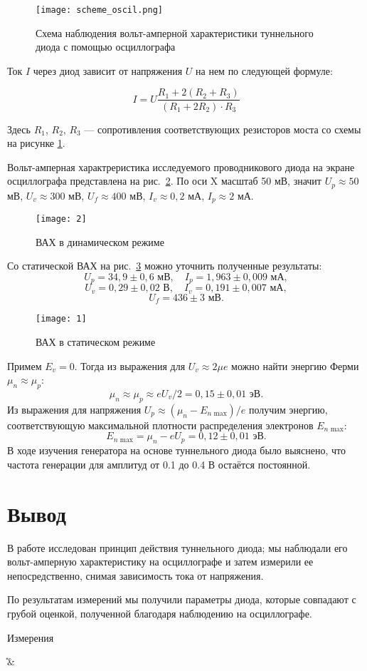 \documentclass[a4paper]{article}
\begin{document}
	\begin{figure}[h]
		\centering	
		\texttt{[image: scheme\_oscil.png]}
		\caption{Схема наблюдения вольт-амперной характеристики туннельного диода с помощью осциллографа}
		\label{pic:scheme_oscil}
	\end{figure}
	
	Ток $I$ через диод зависит от напряжения $U$ на нем по следующей формуле: 
	
	\[ I = U \frac{R_1 + 2(R_2 + R_3)}{(R_1 + 2R_2) \cdot R_3} \]
	
	Здесь $R_1$, $R_2$, $R_3$ --- сопротивления соответствующих резисторов моста со схемы на рисунке \ref{pic:scheme_oscil}. 

Вольт-амперная характреристика исследуемого проводникового диода на экране осциллографа представлена на рис.~\ref{fig:2}. По оси X
масштаб 50 мВ, значит $U_p \approx 50  $ мВ, $U_v \approx 300$ мВ,
$U_f \approx 400$ мВ, $I_v\approx 0,2$ мА, $I_p \approx 2$ мА.
\begin{figure}[htpb]
	\centering
	\texttt{[image: 2]}
	\caption{ВАХ в динамическом режиме}
	\label{fig:2}
\end{figure}
Со статической ВАХ на рис.~\ref{fig:1} можно уточнить полученные
результаты:
\[
U_p= 34,9\pm 0,6 \text{ мВ},\quad I_p=1,963\pm 0,009 \text{ мА}
 ,\]
\[
U_v=0,29 \pm 0,02 \text{ В},\quad I_v=0,191\pm 0,007 \text{ мА}
,\] 
\[
U_f=436\pm 3 \text{ мВ}
.\] 
\begin{figure}[htpb]
	\centering
	\texttt{[image: 1]}
	\caption{ВАХ в статическом режиме}
	\label{fig:1}
\end{figure}
Примем $E_v=0$. Тогда из выражения для $U_v\approx 2\mu e$ 
можно найти энергию Ферми $\mu_n \approx \mu_p$:
\[
\mu_n \approx \mu_p \approx e U_v /2=0,15\pm 0,01 \text{ эВ}
.\] 
Из выражения для напряжения $U_p\approx (\mu_n -E_{n \text{ max}}) /e$ получим энергию, соответствующую максимальной
плотности распределения электронов $E_{n \text{ max}}$:
\[
E_{n \text{  max}}=\mu_n-eU_p= 0,12\pm 0,01 \text{ эВ}
.\] 
В ходе изучения генератора на основе туннельного диода
было выяснено, что частота генерации для амплитуд от
0.1 до 0.4 В остаётся постоянной.
	\section{Вывод} 
	В работе исследован принцип действия туннельного диода; мы наблюдали его вольт-амперную характеристику на осциллографе и затем измерили ее непосредственно, снимая зависимость тока от напряжения. 
	
	По результатам измерений мы получили параметры диода, которые совпадают с грубой оценкой, полученной благодаря наблюдению на осциллографе.
	\begin{table}[htpb]
		\centering
		\caption{Измерения}
		\label{tab:1}
		{\U & \I}
	\end{table}
\end{document}
